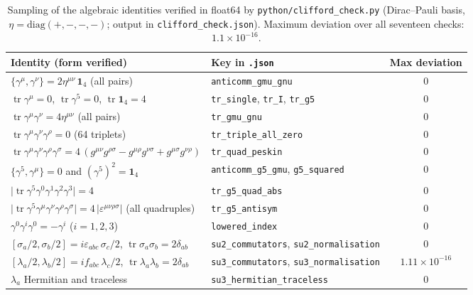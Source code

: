 \begin{table}[h]
\centering
\small
\caption{Sampling of the algebraic identities verified in float64 by
\texttt{python/clifford\_check.py} (Dirac--Pauli basis,
$\eta = \mathrm{diag}(+,-,-,-)$; output in \texttt{clifford\_check.json}).
Maximum deviation over all seventeen checks:
$1.1\times10^{-16}$.}
\begin{tabular}{llc}
\toprule
\textbf{Identity (form verified)} & \textbf{Key in \texttt{.json}} &
\textbf{Max deviation} \\
\midrule
$\{\gamma^\mu,\gamma^\nu\} = 2\eta^{\mu\nu}\,\mathbf{1}_4$ (all pairs)
  & \texttt{anticomm\_gmu\_gnu} & $0$ \\
$\operatorname{tr}\gamma^\mu = 0$, $\operatorname{tr}\gamma^5 = 0$,
  $\operatorname{tr}\mathbf{1}_4 = 4$
  & \texttt{tr\_single}, \texttt{tr\_I}, \texttt{tr\_g5} & $0$ \\
$\operatorname{tr}\gamma^\mu\gamma^\nu = 4\eta^{\mu\nu}$ (all pairs)
  & \texttt{tr\_gmu\_gnu} & $0$ \\
$\operatorname{tr}\gamma^\mu\gamma^\nu\gamma^\rho = 0$ (64 triplets)
  & \texttt{tr\_triple\_all\_zero} & $0$ \\
$\operatorname{tr}\gamma^\mu\gamma^\nu\gamma^\rho\gamma^\sigma
 = 4\,(g^{\mu\nu}g^{\rho\sigma} - g^{\mu\rho}g^{\nu\sigma}
      + g^{\mu\sigma}g^{\nu\rho})$
  & \texttt{tr\_quad\_peskin} & $0$ \\
$\{\gamma^5,\gamma^\mu\} = 0$ and $(\gamma^5)^2 = \mathbf{1}_4$
  & \texttt{anticomm\_g5\_gmu}, \texttt{g5\_squared} & $0$ \\
$\lvert\operatorname{tr}\gamma^5\gamma^0\gamma^1\gamma^2\gamma^3\rvert = 4$
  & \texttt{tr\_g5\_quad\_abs} & $0$ \\
$\lvert\operatorname{tr}\gamma^5\gamma^\mu\gamma^\nu\gamma^\rho
 \gamma^\sigma\rvert = 4\,\lvert\varepsilon^{\mu\nu\rho\sigma}\rvert$
 (all quadruples)
  & \texttt{tr\_g5\_antisym} & $0$ \\
$\gamma^0\gamma^i\gamma^0 = -\gamma^i$ ($i = 1,2,3$)
  & \texttt{lowered\_index} & $0$ \\
$[\sigma_a/2, \sigma_b/2] = i\varepsilon_{abc}\,\sigma_c/2$,
  $\operatorname{tr}\sigma_a\sigma_b = 2\delta_{ab}$
  & \texttt{su2\_commutators}, \texttt{su2\_normalisation} & $0$ \\
$[\lambda_a/2, \lambda_b/2] = i f_{abc}\,\lambda_c/2$,
  $\operatorname{tr}\lambda_a\lambda_b = 2\delta_{ab}$
  & \texttt{su3\_commutators}, \texttt{su3\_normalisation} &
  $1.11\times10^{-16}$ \\
$\lambda_a$ Hermitian and traceless
  & \texttt{su3\_hermitian\_traceless} & $0$ \\
\bottomrule
\end{tabular}
\label{tab:clifford}
\end{table}

